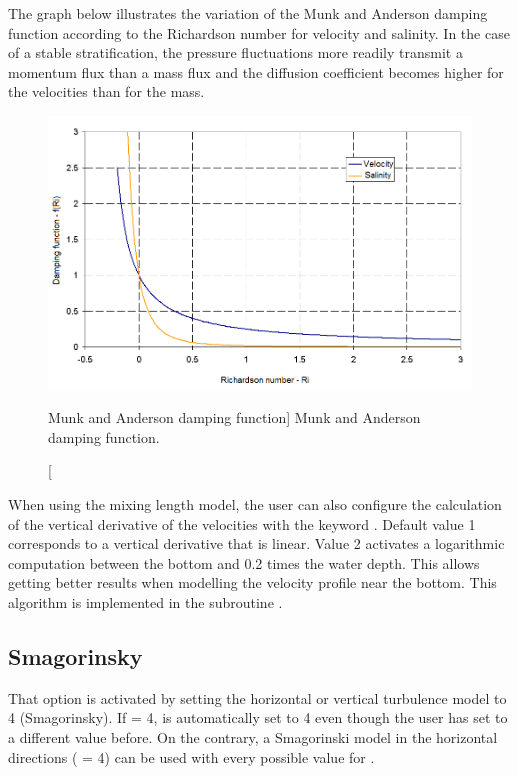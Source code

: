 The graph below illustrates the variation of the Munk and Anderson damping
function according to the Richardson number for velocity and salinity. In the
case of a stable stratification, the pressure fluctuations more readily
transmit a momentum flux than a mass flux and the diffusion coefficient becomes
higher for the velocities than for the mass.

\begin{figure}[H]%
\begin{center}
%
  \includegraphics[width=\textwidth]{./graphics/munk_anderson}
%
\end{center}
\caption
[Munk and Anderson damping function]
{Munk and Anderson damping function.}
\label{fig:munk_anderson}
\end{figure}

When using the mixing length model, the user can also configure the calculation
of the vertical derivative of the velocities with the keyword . Default value 1 corresponds
to a vertical derivative that is linear. Value 2 activates a logarithmic
computation between the bottom and 0.2 times the water depth. This allows
getting better results when modelling the velocity profile near the bottom.
This algorithm is implemented in the subroutine .


\subsection{Smagorinsky}

That option is activated by setting the horizontal or vertical turbulence
model to 4 (Smagorinsky).
If  = 4,
 is automatically set to 4
even though the user has set to a different value before.
On the contrary, a Smagorinski model in the horizontal directions
( = 4) can be used with every possible
value for .

